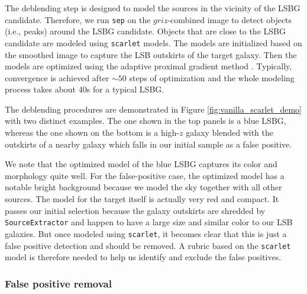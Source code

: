 \documentclass[twocolumn,astrosymb,twocolappendix]{aastex631}
\newcommand{\code}[1]{\texttt{#1}}
\begin{document}
\begin{CJK*}{UTF8}{gbsn}
The deblending step is designed to model the sources in the vicinity of the LSBG candidate. Therefore, we run \code{sep} on the $griz$-combined image to detect objects (i.e., peaks) around the LSBG candidate. Objects that are close to the LSBG candidate are modeled using \code{scarlet} models. The models are initialized based on the smoothed image to capture the LSB outskirts of the target galaxy. Then the models are optimized using the adaptive proximal gradient method \citep{Melchior2019}. Typically, convergence is achieved after $\sim 50$ steps of optimization and the whole modeling process takes about 40s for a typical LSBG.

The deblending procedures are demonstrated in Figure \ref{fig:vanilla_scarlet_demo} with two distinct examples. The one shown in the top panels is a blue LSBG, whereas the one shown on the bottom is a high-$z$ galaxy blended with the outskirts of a nearby galaxy which falls in our initial sample as a false positive. %

We note that the optimized model of the blue LSBG captures its color and morphology quite well. For the false-positive case, the optimized model has a notable bright background because we model the sky together with all other sources. The model for the target itself is actually very red and compact. It passes our initial selection because the galaxy outskirts are shredded by \code{SourceExtractor} and happen to have a large size and similar color to our LSB galaxies. But once modeled using \code{scarlet}, it becomes clear that this is just a false positive detection and should be removed. A rubric based on the \code{scarlet} model is therefore needed to help us identify and exclude the false positives. 



\subsubsection{False positive removal}\label{sec:non-par-measurement}


\end{CJK*}
\end{document}
